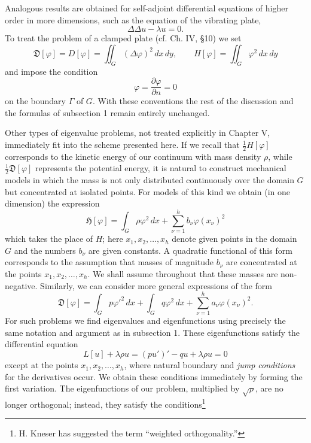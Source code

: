 Analogous results are obtained for self-adjoint differential equations of higher order in more dimensions, such as the equation of the vibrating plate,
\begin{equation}\tag{10}
\Delta\Delta u-\lambda u=0.
\end{equation}
To treat the problem of a clamped plate (cf. Ch. IV, \S10) we set
\[
\mathfrak D[\varphi]=D[\varphi]=\iint_G(\Delta\varphi)^2\,dx\,dy,
\qquad
H[\varphi]=\iint_G\varphi^2\,dx\,dy
\]
and impose the condition
\[
\varphi=\frac{\partial\varphi}{\partial n}=0
\]
on the boundary $\Gamma$ of $G$. With these conventions the rest of the discussion and the formulas of subsection 1 remain entirely unchanged.

Other types of eigenvalue problems, not treated explicitly in Chapter V, immediately fit into the scheme presented here. If we recall that $\tfrac12H[\varphi]$ corresponds to the kinetic energy of our continuum with mass density $\rho$, while $\tfrac12\mathfrak D[\varphi]$ represents the potential energy, it is natural to construct mechanical models in which the mass is not only distributed continuously over the domain $G$ but concentrated at isolated points. For models of this kind we obtain (in one dimension) the expression
\begin{equation}\tag{11}
\mathfrak H[\varphi]=\int_G\rho\varphi^2\,dx+\sum_{\nu=1}^h b_\nu\varphi(x_\nu)^2
\end{equation}
which takes the place of $H$; here $x_1,x_2,\ldots,x_h$ denote given points in the domain $G$ and the numbers $b_\nu$ are given constants. A quadratic functional of this form corresponds to the assumption that masses of magnitude $b_\nu$ are concentrated at the points $x_1,x_2,\ldots,x_h$. We shall assume throughout that these masses are non-negative. Similarly, we can consider more general expressions of the form
\begin{equation}\tag{12}
\mathfrak D[\varphi]=\int_Gp\varphi'^2\,dx+\int_Gq\varphi^2\,dx+\sum_{\nu=1}^h a_\nu\varphi(x_\nu)^2.
\end{equation}
For such problems we find eigenvalues and eigenfunctions using precisely the same notation and argument as in subsection 1. These eigenfunctions satisfy the differential equation
\begin{equation}\tag{13}
L[u]+\lambda\rho u=(pu')'-qu+\lambda\rho u=0
\end{equation}
except at the points $x_1,x_2,\ldots,x_h$, where natural boundary and \emph{jump conditions} for the derivatives occur. We obtain these conditions immediately by forming the first variation. The eigenfunctions of our problem, multiplied by $\sqrt\rho$, are no longer orthogonal; instead, they satisfy the conditions\footnote{H. Kneser has suggested the term ``weighted orthogonality.''}
